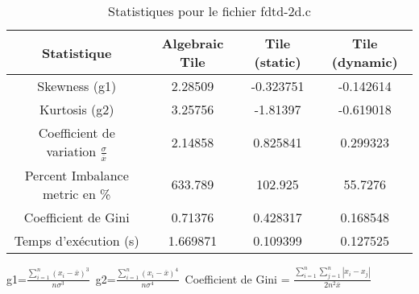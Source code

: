 \documentclass{article}
\begin{document}
\begin{table}[htbp]
  \centering
  \caption{Statistiques pour le fichier fdtd-2d.c}
  \begin{tabular}{|c|c|c|c|}
    \hline
    Statistique & Algebraic Tile & Tile (static) & Tile (dynamic) \\ 
    \hline
    Skewness (g1)  & 2.28509 & -0.323751 & -0.142614 \\ 
    Kurtosis (g2)  & 3.25756 & -1.81397 & -0.619018 \\ 
    Coefficient de variation $ \frac{\sigma}{\overline{x}} $ & 2.14858 & 0.825841 & 0.299323\\ 
    Percent Imbalance metric en \% & 633.789 & 102.925 & 55.7276\\ 
    Coefficient de Gini  & 0.71376 & 0.428317 & 0.168548\\ 
    Temps d'exécution (s) &  1.669871 &  0.109399   &  0.127525   \\ 

    \hline
  \end{tabular}
\end{table}
g1=$ \frac{\sum_{i=1}^{n} (x_i - \overline{x})^3}{n\sigma^3} $\
g2=$ \frac{\sum_{i=1}^{n} (x_i - \overline{x})^4}{n\sigma^4} $\
Coefficient de Gini = $ \frac{\sum_{i=1}^{n}\sum_{j=1}^{n} |x_i - x_j|}{2n^2\overline{x}} $\
\newpage

  
\end{document}
